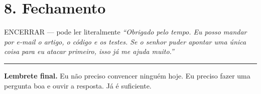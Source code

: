 \documentclass[12pt,a4paper]{article}
\newcommand{\fala}[1]{\textit{\color{ink}``#1''}}
\begin{document}
\section*{8. Fechamento}

\begin{say}{ENCERRAR --- pode ler literalmente}
\fala{Obrigado pelo tempo. Eu posso mandar por e-mail o artigo, o código e os
testes. Se o senhor puder apontar uma única coisa para eu atacar primeiro,
isso já me ajuda muito.}
\end{say}

\vspace{4mm}
\hrule
\vspace{2mm}
{\small\color{rust}\textbf{Lembrete final.} Eu não preciso convencer ninguém hoje.
Eu preciso fazer uma pergunta boa e ouvir a resposta. Já é suficiente.}
\end{document}

